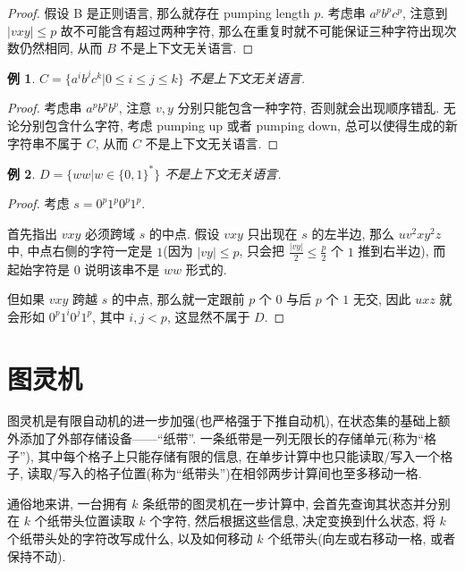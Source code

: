 \documentclass[8pt]{article}
\theoremstyle{compact}
\newtheorem{example}{例}[section]
\def\le{\leqslant}
\begin{document}
\begin{proof}
	假设 B 是正则语言, 那么就存在 pumping length $p$. 考虑串 $a^pb^pc^p$, 注意到 $|vxy| \le p$ 故不可能含有超过两种字符, 那么在重复时就不可能保证三种字符出现次数仍然相同, 从而 $B$ 不是上下文无关语言.
\end{proof}
\begin{example}
	$C = \{a^ib^jc^k | 0 \le i \le j \le k\}$ 不是上下文无关语言.
\end{example}
\begin{proof}
	考虑串 $a^{p}b^{p}b^{p}$, 注意 $v, y$ 分别只能包含一种字符, 否则就会出现顺序错乱. 无论分别包含什么字符, 考虑 pumping up 或者 pumping down, 总可以使得生成的新字符串不属于 $C$, 从而 $C$ 不是上下文无关语言.
\end{proof}
\begin{example}
	$D = \{ww | w \in \{0, 1\}^*\}$ 不是上下文无关语言. 
\end{example}
\begin{proof}
	考虑 $s = 0^p1^p0^p1^p$. 

	首先指出 $vxy$ 必须跨域 $s$ 的中点. 假设 $vxy$ 只出现在 $s$ 的左半边, 那么 $uv^2xy^2z$ 中, 中点右侧的字符一定是 $1$(因为 $|vy| \le p$, 只会把 $\frac{|vy|}{2} \le \frac p2$ 个 $1$ 推到右半边), 而起始字符是 $0$ 说明该串不是 $ww$ 形式的. 

	但如果 $vxy$ 跨越 $s$ 的中点, 那么就一定跟前 $p$ 个 $0$ 与后 $p$ 个 $1$ 无交, 因此 $uxz$ 就会形如 $0^p1^i0^j1^p$, 其中 $i, j < p$, 这显然不属于 $D$.
\end{proof}

\newpage
\section{图灵机}

图灵机是有限自动机的进一步加强(也严格强于下推自动机), 在状态集的基础上额外添加了外部存储设备——“纸带”. 一条纸带是一列无限长的存储单元(称为“格子”), 其中每个格子上只能存储有限的信息, 在单步计算中也只能读取/写入一个格子, 读取/写入的格子位置(称为“纸带头”)在相邻两步计算间也至多移动一格. 

通俗地来讲, 一台拥有 $k$ 条纸带的图灵机在一步计算中, 会首先查询其状态并分别在 $k$ 个纸带头位置读取 $k$ 个字符, 然后根据这些信息, 决定变换到什么状态, 将 $k$ 个纸带头处的字符改写成什么, 以及如何移动 $k$ 个纸带头(向左或右移动一格, 或者保持不动). 
\end{document}
